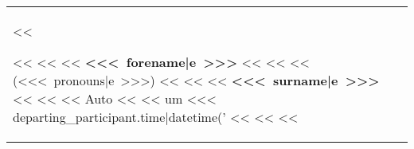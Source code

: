         \begin{tabular}{ @{} p{105mm} @{} p{105mm} @{} }
        <<%
            \vspace*{6mm}%
            \hspace*{6mm}%
            \begin{minipage}[b][38.8mm][t]{93mm}
                <<%
                    \headingfamily
                    <<%
                    <<%
                    \fontsize{<<< font_size >>>}{<<< line_size >>>}
                    \selectfont \textbf{\mbox{<<< forename|e >>>}}
                    <<%
                    <<%
                        <<%
                        \fontsize{<<< font_size >>>}{<<< line_size >>>}
                        \selectfont \hfill\mbox{(<<< pronouns|e >>>)}
                    <<%
                    <<%
                    <<%
                    \fontsize{<<< font_size >>>}{<<< line_size >>>}
                    \selectfont \textbf{\mbox{<<< surname|e >>>}}
                <<%
                \vfill
                <<%
                    <<%
                        Auto
                        <<%
                            <<%
                            um <<< departing_participant.time|datetime('%
                        <<%
                    <<%
                        <<%

\end{minipage}
\end{tabular}
